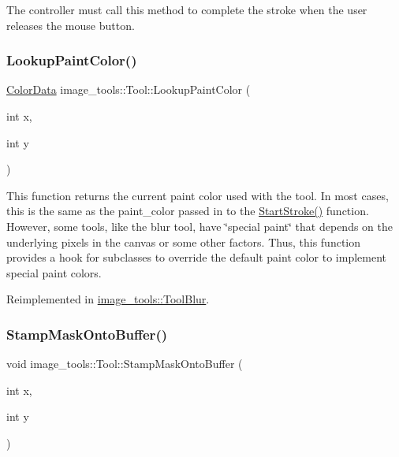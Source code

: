 The controller must call this method to complete the stroke when the user releases the mouse button. \mbox{\label{classimage__tools_1_1Tool_aaf72d26377a6563fe9002e3288933285}} 
\subsubsection{\texorpdfstring{Lookup\+Paint\+Color()}{LookupPaintColor()}}
{\footnotesize\ttfamily \hyperlink{classimage__tools_1_1ColorData}{Color\+Data} image\+\_\+tools\+::\+Tool\+::\+Lookup\+Paint\+Color (\begin{DoxyParamCaption}\item[{int}]{x,  }\item[{int}]{y }\end{DoxyParamCaption})\hspace{0.3cm}{\ttfamily [virtual]}}

This function returns the current paint color used with the tool. In most cases, this is the same as the paint\+\_\+color passed in to the \hyperlink{classimage__tools_1_1Tool_a1b7cd7d59588923d7e29b6150334f5b8}{Start\+Stroke()} function. However, some tools, like the blur tool, have \char`\"{}special paint\char`\"{} that depends on the underlying pixels in the canvas or some other factors. Thus, this function provides a hook for subclasses to override the default paint color to implement special paint colors. 

Reimplemented in \hyperlink{classimage__tools_1_1ToolBlur_af709da063f86da74d878d079fd2aab5e}{image\+\_\+tools\+::\+Tool\+Blur}.

\mbox{\label{classimage__tools_1_1Tool_a6eb57021e1e59590075411b904e62905}} 
\subsubsection{\texorpdfstring{Stamp\+Mask\+Onto\+Buffer()}{StampMaskOntoBuffer()}}
{\footnotesize\ttfamily void image\+\_\+tools\+::\+Tool\+::\+Stamp\+Mask\+Onto\+Buffer (\begin{DoxyParamCaption}\item[{int}]{x,  }\item[{int}]{y }\end{DoxyParamCaption})}


